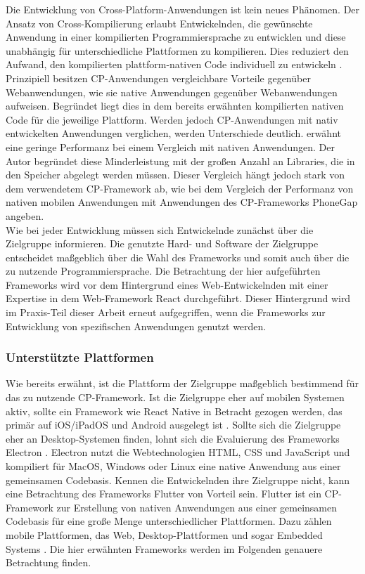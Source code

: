 \documentclass[a4paper]{scrartcl}
\begin{document}
Die Entwicklung von Cross-Platform-Anwendungen ist kein neues Phänomen. Der Ansatz von Cross-Kompilierung erlaubt Entwickelnden, die gewünschte Anwendung in einer kompilierten Programmiersprache zu entwicklen und diese unabhängig für unterschiedliche Plattformen zu kompilieren. Dies reduziert den Aufwand, den kompilierten plattform-nativen Code individuell zu entwickeln \autocite[7]{Xamarin}. \\
Prinzipiell besitzen CP-Anwendungen vergleichbare Vorteile gegenüber Webanwendungen, wie sie native Anwendungen gegenüber Webanwendungen aufweisen. Begründet liegt dies in dem bereits erwähnten kompilierten nativen Code für die jeweilige Plattform. Werden jedoch CP-Anwendungen mit nativ entwickelten Anwendungen verglichen, werden Unterschiede deutlich. \textcite[7]{Xamarin} erwähnt eine geringe Performanz bei einem Vergleich mit nativen Anwendungen. Der Autor begründet diese Minderleistung mit der großen Anzahl an Libraries, die in den Speicher abgelegt werden müssen. Dieser Vergleich hängt jedoch stark von dem verwendetem CP-Framework ab, wie \textcite[134]{CP-mobile} bei dem Vergleich der Performanz von nativen mobilen Anwendungen mit Anwendungen des CP-Frameworks PhoneGap angeben. \\
Wie bei jeder Entwicklung müssen sich Entwickelnde zunächst über die Zielgruppe informieren. Die genutzte Hard- und Software der Zielgruppe entscheidet maßgeblich über die Wahl des Frameworks und somit auch über die zu nutzende Programmiersprache. Die Betrachtung der hier aufgeführten Frameworks wird vor dem Hintergrund eines Web-Entwickelnden mit einer Expertise in dem Web-Framework React durchgeführt. Dieser Hintergrund wird im Praxis-Teil dieser Arbeit erneut aufgegriffen, wenn die Frameworks zur Entwicklung von spezifischen Anwendungen genutzt werden.

\subsubsection{Unterstützte Plattformen}

Wie bereits erwähnt, ist die Plattform der Zielgruppe maßgeblich bestimmend für das zu nutzende CP-Framework. Ist die Zielgruppe eher auf mobilen Systemen aktiv, sollte ein Framework wie React Native in Betracht gezogen werden, das primär auf iOS/iPadOS und Android ausgelegt ist \autocite{React_Native}. Sollte sich die Zielgruppe eher an Desktop-Systemen finden, lohnt sich die Evaluierung des Frameworks Electron \autocite{Electron.js}. Electron nutzt die Webtechnologien HTML, CSS und JavaScript und kompiliert für MacOS, Windows oder Linux eine native Anwendung aus einer gemeinsamen Codebasis. Kennen die Entwickelnden ihre Zielgruppe nicht, kann eine Betrachtung des Frameworks Flutter von Vorteil sein. Flutter ist ein CP-Framework zur Erstellung von nativen Anwendungen aus einer gemeinsamen Codebasis für eine große Menge unterschiedlicher Plattformen. Dazu zählen mobile Plattformen, das Web, Desktop-Plattformen und sogar Embedded Systems \autocite{Flutter}. Die hier erwähnten Frameworks werden im Folgenden genauere Betrachtung finden.
\end{document}
